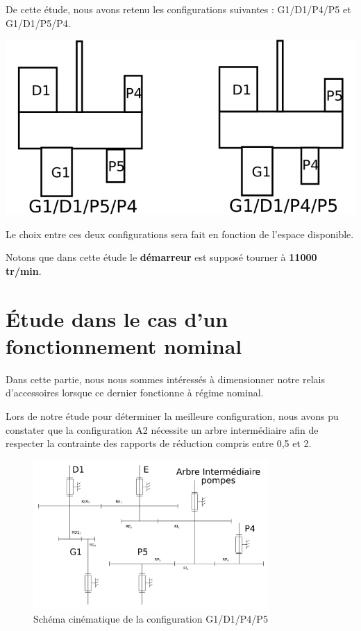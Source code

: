 \documentclass{config}
\begin{document}
\begin{spacing}{1.2}
De cette étude, nous avons retenu les configurations suivantes : G1/D1/P4/P5 et G1/D1/P5/P4.

\newpage
\begin{center}
\includegraphics[width=\textwidth]{conf_retenu.png}
\end{center}

Le choix entre ces deux configurations sera fait en fonction de l'espace disponible.

Notons que dans cette étude le \textbf{démarreur} est supposé tourner à \textbf{11000 tr/min}.

\newpage
\section{Étude dans le cas d'un fonctionnement nominal}

Dans cette partie, nous nous sommes intéressés à dimensionner notre relais d'accessoires lorsque ce dernier fonctionne à régime nominal. 

Lors de notre étude pour déterminer la meilleure configuration, nous avons pu constater que la configuration A2 nécessite un arbre intermédiaire afin de respecter la contrainte des rapports de réduction compris entre  0,5 et 2.

\begin{figure}[h!]
 \centering
 \includegraphics[width=0.8\textwidth]{Schema_cinematique_engrenages_V1.png}
 \caption{Schéma cinématique de la configuration G1/D1/P4/P5}
\end{figure}



\end{spacing}
\end{document}
